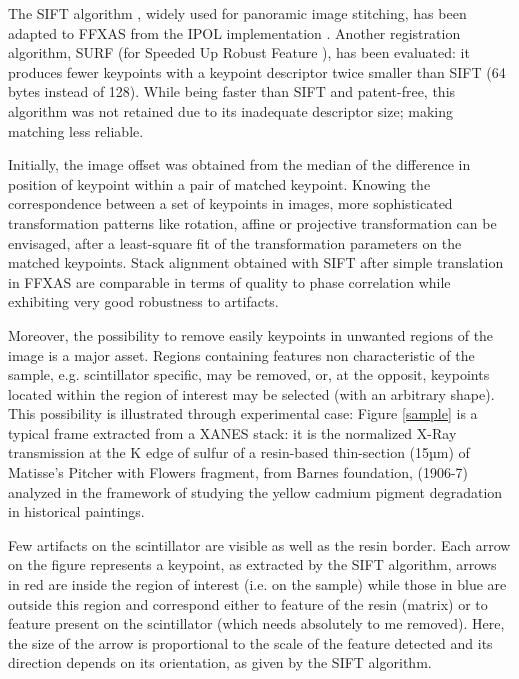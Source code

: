 \documentclass[preprint]{iucr}
\begin{document}
The SIFT algorithm \cite{Lowe99,Lowe04}, widely used for panoramic image
stitching, has been adapted to FFXAS from the IPOL implementation \cite{ASIFT}.
Another registration algorithm, SURF (for Speeded Up Robust Feature
\cite{surf}), has been evaluated: it produces fewer keypoints with a keypoint
descriptor twice smaller than SIFT (64 bytes instead of 128).
While being faster than SIFT and patent-free, this algorithm was not
retained due to its inadequate descriptor size; 
making matching less reliable.

Initially, the image offset was obtained from the median of the
difference in position of keypoint within a pair of matched keypoint.
Knowing the correspondence between a set of keypoints in images,
more sophisticated transformation patterns like rotation, affine
or projective transformation can be envisaged, after a least-square fit of the
transformation parameters on the matched keypoints.
Stack alignment obtained with SIFT after simple translation in FFXAS are
comparable in terms of quality to phase correlation while exhibiting very good
robustness to artifacts.

Moreover, the possibility to remove easily keypoints in unwanted regions of 
the image is a major asset. 
Regions containing features non characteristic of the sample, e.g. scintillator 
specific, may be removed, or, at the opposit, keypoints located within the 
region of interest may be selected (with an arbitrary shape).
This possibility is illustrated through experimental case: Figure
\ref{sample}
is a typical frame extracted from a XANES stack:
it is the normalized X-Ray transmission at the K edge of sulfur 
of a resin-based thin-section 
(15µm) of Matisse’s Pitcher with Flowers fragment, from Barnes 
foundation, (1906-7) analyzed in the framework of studying the yellow 
cadmium pigment degradation in historical paintings.

Few artifacts on the scintillator are visible as well as the resin border.
Each arrow on the figure represents a keypoint, as extracted by the SIFT
algorithm, arrows in red are inside the region of interest (i.e. on the sample)
while those in blue are outside this region and
correspond either to feature of the resin (matrix) or to feature present on the
scintillator (which needs absolutely to me removed).
Here, the size of the arrow is proportional to the scale of the feature
detected and its direction depends on its orientation, as given by the SIFT algorithm.
\end{document}
